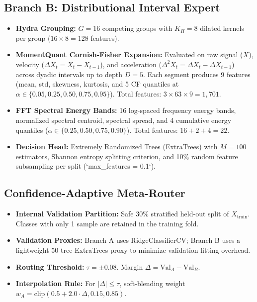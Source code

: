 \documentclass[journal,onecolumn]{article}
\begin{document}
\subsection{Branch B: Distributional Interval Expert}
\begin{itemize}
    \item \textbf{Hydra Grouping:} $G = 16$ competing groups with $K_H = 8$ dilated kernels per group ($16 \times 8 = 128$ features).
    \item \textbf{MomentQuant Cornish-Fisher Expansion:} Evaluated on raw signal ($X$), velocity ($\Delta X_t = X_t - X_{t-1}$), and acceleration ($\Delta^2 X_t = \Delta X_t - \Delta X_{t-1}$) across dyadic intervals up to depth $D = 5$. Each segment produces 9 features (mean, std, skewness, kurtosis, and 5 CF quantiles at $\alpha \in \{0.05, 0.25, 0.50, 0.75, 0.95\}$). Total features: $3 \times 63 \times 9 = 1,701$.
    \item \textbf{FFT Spectral Energy Bands:} 16 log-spaced frequency energy bands, normalized spectral centroid, spectral spread, and 4 cumulative energy quantiles ($\alpha \in \{0.25, 0.50, 0.75, 0.90\}$). Total features: $16 + 2 + 4 = 22$.
    \item \textbf{Decision Head:} Extremely Randomized Trees (ExtraTrees) with $M = 100$ estimators, Shannon entropy splitting criterion, and 10\% random feature subsampling per split (`max_features = 0.1`).
\end{itemize}

\subsection{Confidence-Adaptive Meta-Router}
\begin{itemize}
    \item \textbf{Internal Validation Partition:} Safe 30\% stratified held-out split of $X_{\text{train}}$. Classes with only 1 sample are retained in the training fold.
    \item \textbf{Validation Proxies:} Branch A uses RidgeClassifierCV; Branch B uses a lightweight 50-tree ExtraTrees proxy to minimize validation fitting overhead.
    \item \textbf{Routing Threshold:} $\tau = \pm 0.08$. Margin $\Delta = \text{Val}_A - \text{Val}_B$.
    \item \textbf{Interpolation Rule:} For $|\Delta| \le \tau$, soft-blending weight $w_A = \text{clip}(0.5 + 2.0 \cdot \Delta, 0.15, 0.85)$.
\end{itemize}
\end{document}
